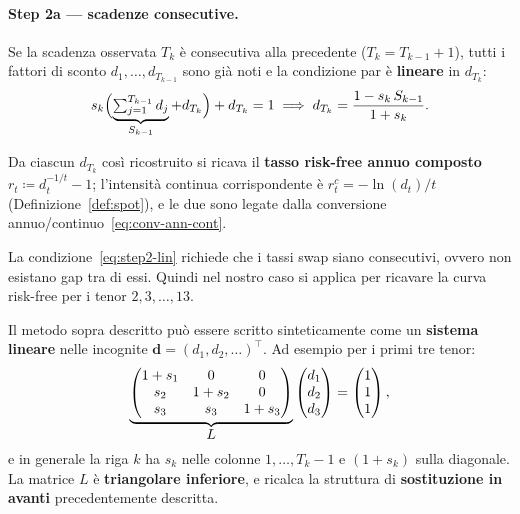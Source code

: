 \documentclass[11pt,a4paper]{article}
\theoremstyle{plain}
\theoremstyle{definition}
\theoremstyle{remark}
\newcommand{\defeq}{\coloneqq}
\begin{document}
\paragraph{Step 2a --- scadenze consecutive.}
Se la scadenza osservata $T_{k}$ \`e consecutiva alla precedente ($T_{k}=T_{k-1}+1$), tutti i
fattori di sconto $d_1,\dots,d_{T_{k-1}}$ sono gi\`a noti e la condizione par \`e
\textbf{lineare} in $d_{T_k}$:
\begin{equation}
  \label{eq:step2-lin}
  s_{k}\Bigl(\underbrace{\textstyle\sum_{j=1}^{T_{k-1}} d_j}_{S_{k-1}} + d_{T_k}\Bigr)
  + d_{T_k} = 1
  \;\Longrightarrow\;
  d_{T_k} = \frac{1 - s_{k}\,S_{k-1}}{1 + s_{k}}.
\end{equation}

Da ciascun $d_{T_k}$ cos\`i ricostruito si ricava il \textbf{tasso risk-free annuo composto}
$r_t \defeq d_t^{-1/t}-1$; l'intensit\`a continua corrispondente \`e $r^c_t = -\ln(d_t)/t$
(Definizione~\ref{def:spot}), e le due sono legate dalla conversione
annuo/continuo~\eqref{eq:conv-ann-cont}.

La condizione~\eqref{eq:step2-lin} richiede che i tassi swap siano consecutivi, ovvero non esistano gap tra di essi. Quindi nel nostro caso si applica per ricavare la curva risk-free per i tenor $2,3,\dots,13$.


Il metodo sopra descritto pu\`o essere scritto sinteticamente come un \textbf{sistema lineare}
nelle incognite $\mathbf d=(d_1,d_2,\ldots)^\top$. Ad esempio per i primi tre tenor:
\begin{equation}
  \label{eq:boot-tri}
  \underbrace{%
  \begin{pmatrix}
    1+s_1 & 0     & 0     \\
    s_2   & 1+s_2 & 0     \\
    s_3   & s_3   & 1+s_3
  \end{pmatrix}}_{\displaystyle L}
  \begin{pmatrix} d_1 \\ d_2 \\ d_3 \end{pmatrix}
  =
  \begin{pmatrix} 1 \\ 1 \\ 1 \end{pmatrix},
\end{equation}
e in generale la riga $k$ ha $s_k$ nelle colonne $1,\dots,T_k-1$ e $(1+s_k)$ sulla diagonale.
La matrice $L$ \`e \textbf{triangolare inferiore}, e ricalca la struttura di \textbf{sostituzione in avanti} precedentemente descritta.
\end{document}

